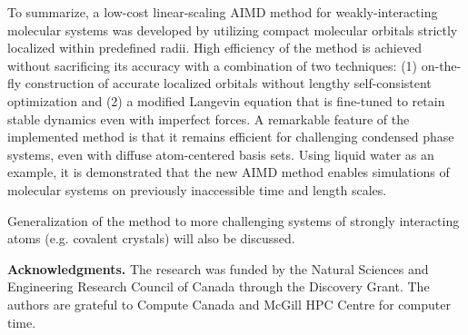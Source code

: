 \documentclass[aps,prl,reprint,amsmath,amssymb]{revtex4-1}
\begin{document}
To summarize, a low-cost linear-scaling AIMD method for weakly-interacting molecular systems was developed by utilizing compact molecular orbitals strictly localized within predefined radii. High efficiency of the method is achieved without sacrificing its accuracy with a combination of two techniques: (1) on-the-fly construction of accurate localized orbitals without lengthy self-consistent optimization and (2) a modified Langevin equation that is fine-tuned to retain stable dynamics even with imperfect forces. A remarkable feature of the implemented method is that it remains efficient for challenging condensed phase systems, even with diffuse atom-centered basis sets. Using liquid water as an example, it is demonstrated that the new AIMD method enables simulations of molecular systems on previously inaccessible time and length scales. 

Generalization of the method to more challenging systems of strongly interacting atoms (e.g. covalent crystals) will also be discussed.



\textbf{Acknowledgments.} The research was funded by the Natural Sciences and Engineering Research Council of Canada through the Discovery Grant. The authors are grateful to Compute Canada and McGill HPC Centre for computer time.



\end{document}
